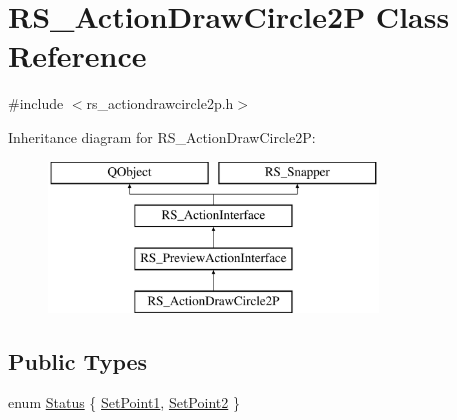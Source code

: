 \hypertarget{classRS__ActionDrawCircle2P}{\section{R\-S\-\_\-\-Action\-Draw\-Circle2\-P Class Reference}
\label{classRS__ActionDrawCircle2P}
}


{\ttfamily \#include $<$rs\-\_\-actiondrawcircle2p.\-h$>$}

Inheritance diagram for R\-S\-\_\-\-Action\-Draw\-Circle2\-P\-:\begin{figure}[H]
\begin{center}
\leavevmode
\includegraphics[height=4.000000cm]{classRS__ActionDrawCircle2P}
\end{center}
\end{figure}
\subsection*{Public Types}
\begin{DoxyCompactItemize}
\item 
enum \hyperlink{classRS__ActionDrawCircle2P_a6808ccbf598645949cd3b1ce7a218411}{Status} \{ \hyperlink{classRS__ActionDrawCircle2P_a6808ccbf598645949cd3b1ce7a218411af04dfd42d571b8b4571562c9150d446e}{Set\-Point1}, 
\hyperlink{classRS__ActionDrawCircle2P_a6808ccbf598645949cd3b1ce7a218411a0ce1c43716381b628e20a7261dad6ade}{Set\-Point2}
 \}
\end{DoxyCompactItemize}
